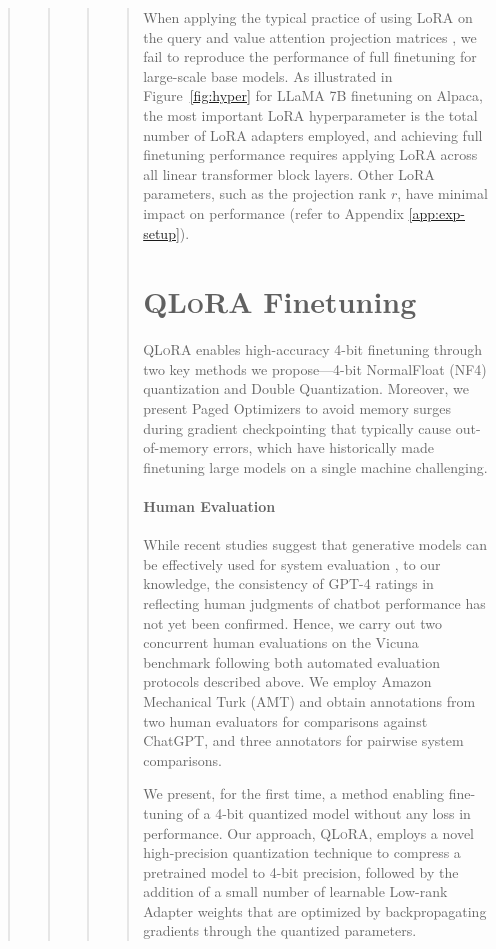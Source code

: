 \begin{quote}
\begin{quote}
\begin{quote}
\begin{quote}
When applying the typical practice of using LoRA on the query and value attention projection matrices \citep{hu2021lora}, we fail to reproduce the performance of full finetuning for large-scale base models. As illustrated in Figure~\ref{fig:hyper} for LLaMA 7B finetuning on Alpaca, the most important LoRA hyperparameter is the total number of LoRA adapters employed, and achieving full finetuning performance requires applying LoRA across all linear transformer block layers. Other LoRA parameters, such as the projection rank $r$, have minimal impact on performance (refer to Appendix \ref{app:exp-setup}).

\section{\textsc{QLoRA} Finetuning}

\textsc{QLoRA} enables high-accuracy 4-bit finetuning through two key methods we propose—4-bit NormalFloat (NF4) quantization and Double Quantization. Moreover, we present Paged Optimizers to avoid memory surges during gradient checkpointing that typically cause out-of-memory errors, which have historically made finetuning large models on a single machine challenging.

\paragraph{Human Evaluation} While recent studies suggest that generative models can be effectively used for system evaluation \citep{fu2023gptscore}, to our knowledge, the consistency of GPT-4 ratings in reflecting human judgments of chatbot performance has not yet been confirmed. Hence, we carry out two concurrent human evaluations on the Vicuna benchmark following both automated evaluation protocols described above. We employ Amazon Mechanical Turk (AMT) and obtain annotations from two human evaluators for comparisons against ChatGPT, and three annotators for pairwise system comparisons.

We present, for the first time, a method enabling fine-tuning of a 4-bit quantized model without any loss in performance. Our approach, \textsc{QLoRA}, employs a novel high-precision quantization technique to compress a pretrained model to 4-bit precision, followed by the addition of a small number of learnable Low-rank Adapter weights \citep{hu2021lora} that are optimized by backpropagating gradients through the quantized parameters.


\end{quote}
\end{quote}
\end{quote}
\end{quote}
